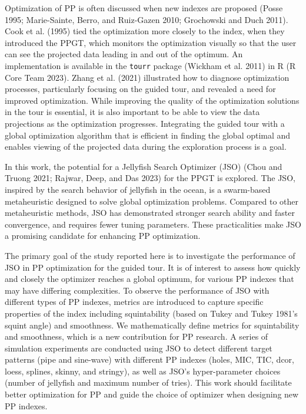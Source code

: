 \documentclass[
  12pt,
]{interact}
\theoremstyle{plain}
\begin{document}
Optimization of PP is often discussed when new indexes are proposed
(Posse 1995; Marie-Sainte, Berro, and Ruiz-Gazen 2010; Grochowski and
Duch 2011). Cook et al. (1995) tied the optimization more closely to the
index, when they introduced the PPGT, which monitors the optimization
visually so that the user can see the projected data leading in and out
of the optimum. An implementation is available in the \texttt{tourr}
package (Wickham et al. 2011) in R (R Core Team 2023). Zhang et al.
(2021) illustrated how to diagnose optimization processes, particularly
focusing on the guided tour, and revealed a need for improved
optimization. While improving the quality of the optimization solutions
in the tour is essential, it is also important to be able to view the
data projections as the optimization progresses. Integrating the guided
tour with a global optimization algorithm that is efficient in finding
the global optimal and enables viewing of the projected data during the
exploration process is a goal.

In this work, the potential for a Jellyfish Search Optimizer (JSO) (Chou
and Truong 2021; Rajwar, Deep, and Das 2023) for the PPGT is explored.
The JSO, inspired by the search behavior of jellyfish in the ocean, is a
swarm-based metaheuristic designed to solve global optimization
problems. Compared to other metaheuristic methods, JSO has demonstrated
stronger search ability and faster convergence, and requires fewer
tuning parameters. These practicalities make JSO a promising candidate
for enhancing PP optimization.

The primary goal of the study reported here is to investigate the
performance of JSO in PP optimization for the guided tour. It is of
interest to assess how quickly and closely the optimizer reaches a
global optimum, for various PP indexes that may have differing
complexities. To observe the performance of JSO with different types of
PP indexes, metrics are introduced to capture specific properties of the
index including squintability (based on Tukey and Tukey 1981's squint
angle) and smoothness. We mathematically define metrics for
squintability and smoothness, which is a new contribution for PP
research. A series of simulation experiments are conducted using JSO to
detect different target patterns (pipe and sine-wave) with different PP
indexes (holes, MIC, TIC, dcor, loess, splines, skinny, and stringy), as
well as JSO's hyper-parameter choices (number of jellyfish and maximum
number of tries). This work should facilitate better optimization for PP
and guide the choice of optimizer when designing new PP indexes.
\end{document}

